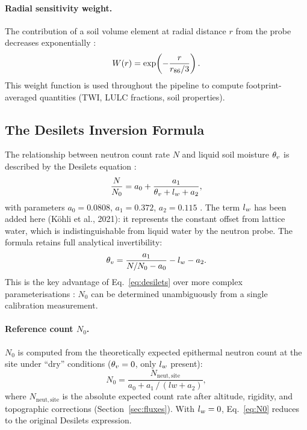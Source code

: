 \paragraph{Radial sensitivity weight.}
The contribution of a soil volume element at radial distance $r$ from
the probe decreases exponentially \citep{kohli2015}:
\begin{equation}
  W(r) = \exp\!\left(-\frac{r}{r_{86} / 3}\right).
  \label{eq:Wr}
\end{equation}
This weight function is used throughout the pipeline to compute
footprint-averaged quantities (TWI, LULC fractions, soil properties).

\subsection{The Desilets Inversion Formula}
\label{sec:desilets}

The relationship between neutron count rate $N$ and liquid soil
moisture $\theta_v$ is described by the Desilets equation
\citep{desilets2010}:
\begin{equation}
  \frac{N}{N_0} = a_0 + \frac{a_1}{\theta_v + l_w + a_2},
  \label{eq:desilets}
\end{equation}
with parameters $a_0 = 0.0808$, $a_1 = 0.372$, $a_2 = 0.115$
\citep{desilets2010}.
The term $l_w$ has been added here (K\"ohli et al., 2021): it represents
the constant offset from lattice water, which is indistinguishable from
liquid water by the neutron probe.
The formula retains full analytical invertibility:
\begin{equation}
  \theta_v = \frac{a_1}{N/N_0 - a_0} - l_w - a_2.
  \label{eq:desilets_inv}
\end{equation}
This is the key advantage of Eq.~\eqref{eq:desilets} over more
complex parameterisations \citep{kohli2015}: $N_0$ can be determined
unambiguously from a single calibration measurement.

\paragraph{Reference count $N_0$.}
$N_0$ is computed from the theoretically expected epithermal neutron
count at the site under ``dry'' conditions ($\theta_v = 0$, only $l_w$
present):
\begin{equation}
  N_0 = \frac{N_\mathrm{neut,site}}{a_0 + a_1\,/\,(lw + a_2)},
  \label{eq:N0}
\end{equation}
where $N_\mathrm{neut,site}$ is the absolute expected count rate after
altitude, rigidity, and topographic corrections (Section~\ref{sec:fluxes}).
With $l_w = 0$, Eq.~\eqref{eq:N0} reduces to the original Desilets
expression.

